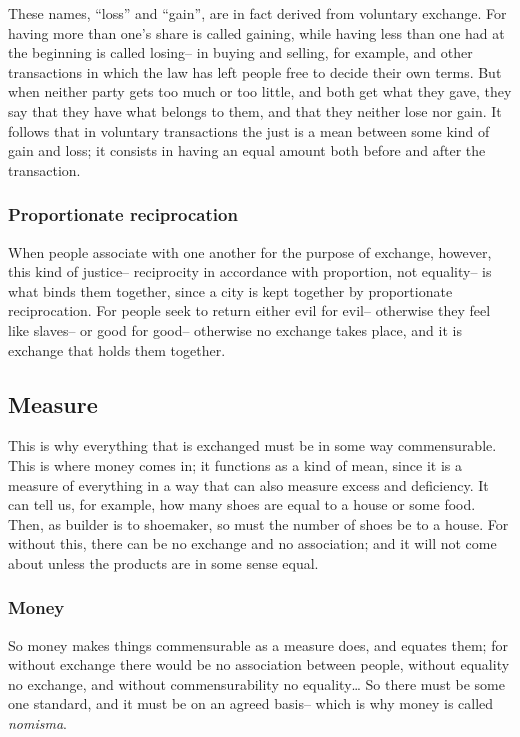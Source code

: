                     These names, “loss” and “gain”, are in fact derived from voluntary exchange. For having more than one’s share is called gaining, while having less than one had at the beginning is called losing– in buying and selling, for example, and other transactions in which the law has left people free to decide their own terms. But when neither party gets too much or too little, and both get what they gave, they say that they have what belongs to them, and that they neither lose nor gain. It follows that in voluntary transactions the just is a mean between some kind of gain and loss; it consists in having an equal amount both before and after the transaction.

                \subsubsection{Proportionate reciprocation}

                    When people associate with one another for the purpose of exchange, however, this kind of justice– reciprocity in accordance with proportion, not equality– is what binds them together, since a city is kept together by proportionate reciprocation. For people seek to return either evil for evil– otherwise they feel like slaves– or good for good– otherwise no exchange takes place, and it is exchange that holds them together.

            \subsection{Measure}

                This is why everything that is exchanged must be in some way commensurable. This is where money comes in; it functions as a kind of mean, since it is a measure of everything in a way that can also measure excess and deficiency. It can tell us, for example, how many shoes are equal to a house or some food. Then, as builder is to shoemaker, so must the number of shoes be to a house. For without this, there can be no exchange and no association; and it will not come about unless the products are in some sense equal.

                \subsubsection{Money}

                    So money makes things commensurable as a measure does, and equates them; for without exchange there would be no association between people, without equality no exchange, and without commensurability no equality… So there must be some one standard, and it must be on an agreed basis– which is why money is called \textit{nomisma}.    

